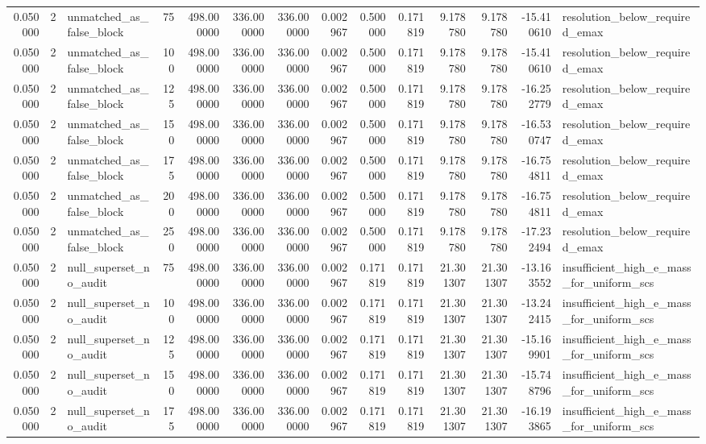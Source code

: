 \begin{tabular}{rrlrrrrrrrrrrl}
0.050000 & 2 & unmatched_as_false_block & 75 & 498.000000 & 336.000000 & 336.000000 & 0.002967 & 0.500000 & 0.171819 & 9.178780 & 9.178780 & -15.410610 & resolution_below_required_emax \\
0.050000 & 2 & unmatched_as_false_block & 100 & 498.000000 & 336.000000 & 336.000000 & 0.002967 & 0.500000 & 0.171819 & 9.178780 & 9.178780 & -15.410610 & resolution_below_required_emax \\
0.050000 & 2 & unmatched_as_false_block & 125 & 498.000000 & 336.000000 & 336.000000 & 0.002967 & 0.500000 & 0.171819 & 9.178780 & 9.178780 & -16.252779 & resolution_below_required_emax \\
0.050000 & 2 & unmatched_as_false_block & 150 & 498.000000 & 336.000000 & 336.000000 & 0.002967 & 0.500000 & 0.171819 & 9.178780 & 9.178780 & -16.530747 & resolution_below_required_emax \\
0.050000 & 2 & unmatched_as_false_block & 175 & 498.000000 & 336.000000 & 336.000000 & 0.002967 & 0.500000 & 0.171819 & 9.178780 & 9.178780 & -16.754811 & resolution_below_required_emax \\
0.050000 & 2 & unmatched_as_false_block & 200 & 498.000000 & 336.000000 & 336.000000 & 0.002967 & 0.500000 & 0.171819 & 9.178780 & 9.178780 & -16.754811 & resolution_below_required_emax \\
0.050000 & 2 & unmatched_as_false_block & 250 & 498.000000 & 336.000000 & 336.000000 & 0.002967 & 0.500000 & 0.171819 & 9.178780 & 9.178780 & -17.232494 & resolution_below_required_emax \\
0.050000 & 2 & null_superset_no_audit & 75 & 498.000000 & 336.000000 & 336.000000 & 0.002967 & 0.171819 & 0.171819 & 21.301307 & 21.301307 & -13.163552 & insufficient_high_e_mass_for_uniform_scs \\
0.050000 & 2 & null_superset_no_audit & 100 & 498.000000 & 336.000000 & 336.000000 & 0.002967 & 0.171819 & 0.171819 & 21.301307 & 21.301307 & -13.242415 & insufficient_high_e_mass_for_uniform_scs \\
0.050000 & 2 & null_superset_no_audit & 125 & 498.000000 & 336.000000 & 336.000000 & 0.002967 & 0.171819 & 0.171819 & 21.301307 & 21.301307 & -15.169901 & insufficient_high_e_mass_for_uniform_scs \\
0.050000 & 2 & null_superset_no_audit & 150 & 498.000000 & 336.000000 & 336.000000 & 0.002967 & 0.171819 & 0.171819 & 21.301307 & 21.301307 & -15.748796 & insufficient_high_e_mass_for_uniform_scs \\
0.050000 & 2 & null_superset_no_audit & 175 & 498.000000 & 336.000000 & 336.000000 & 0.002967 & 0.171819 & 0.171819 & 21.301307 & 21.301307 & -16.193865 & insufficient_high_e_mass_for_uniform_scs \\

\end{tabular}

